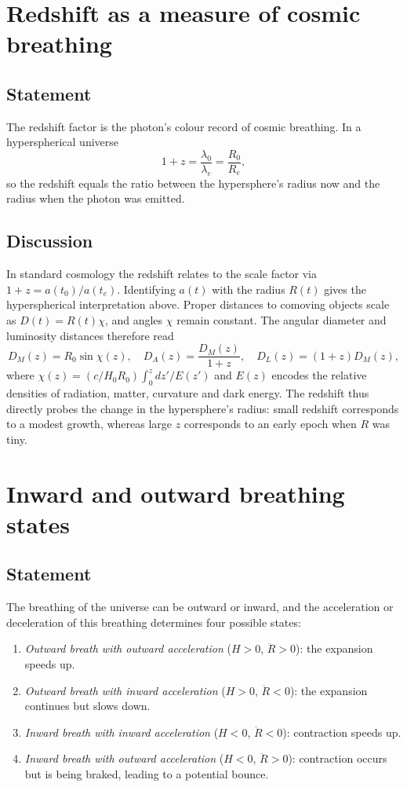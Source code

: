 \documentclass[12pt,a4paper]{article}
\begin{document}
\section{Redshift as a measure of cosmic breathing}
\label{sec:redshift}
\subsection{Statement}
The redshift factor is the photon’s colour record of cosmic breathing.  In a hyperspherical universe
\[
1+z = \frac{\lambda_0}{\lambda_e} = \frac{R_0}{R_e},
\]
so the redshift equals the ratio between the hypersphere’s radius now and the radius when the photon was emitted.

\subsection{Discussion}
In standard cosmology the redshift relates to the scale factor via $1+z = a(t_0)/a(t_e)$.  Identifying $a(t)$ with the radius $R(t)$ gives the hyperspherical interpretation above.  Proper distances to comoving objects scale as $D(t)=R(t)\chi$, and angles $\chi$ remain constant.  The angular diameter and luminosity distances therefore read
\[
D_M(z)=R_0 \sin\chi(z), \quad D_A(z)=\frac{D_M(z)}{1+z}, \quad D_L(z)=(1+z)D_M(z),
\]
where $\chi(z)= (c/H_0 R_0) \int_0^z \!dz'/E(z')$ and $E(z)$ encodes the relative densities of radiation, matter, curvature and dark energy.  The redshift thus directly probes the change in the hypersphere’s radius: small redshift corresponds to a modest growth, whereas large $z$ corresponds to an early epoch when $R$ was tiny.

\section{Inward and outward breathing states}
\label{sec:states}
\subsection{Statement}
The breathing of the universe can be outward or inward, and the acceleration or deceleration of this breathing determines four possible states:
\begin{enumerate}
\item \emph{Outward breath with outward acceleration} ($H>0$, $\ddot{R}>0$): the expansion speeds up.
\item \emph{Outward breath with inward acceleration} ($H>0$, $\ddot{R}<0$): the expansion continues but slows down.
\item \emph{Inward breath with inward acceleration} ($H<0$, $\ddot{R}<0$): contraction speeds up.
\item \emph{Inward breath with outward acceleration} ($H<0$, $\ddot{R}>0$): contraction occurs but is being braked, leading to a potential bounce.
\end{enumerate}
\end{document}

